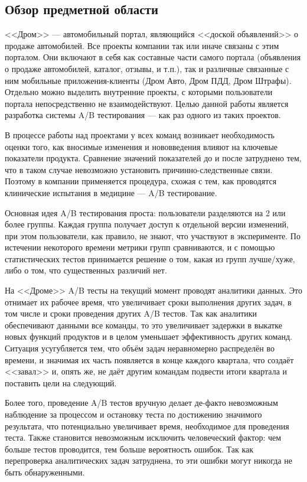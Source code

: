 \documentclass[../document.tex]{subfiles}
\begin{document}
	\subsection{Обзор предметной области}
	\par <<Дром>> --- автомобильный портал, являющийся <<доской объявлений>> о продаже автомобилей. Все проекты компании так или иначе связаны с этим порталом. Они включают в себя как составные части самого портала (объявления о продаже автомобилей, каталог, отзывы, и т.п.), так и различные связанные с ним мобильные приложения-клиенты (Дром Авто, Дром ПДД, Дром Штрафы). Отдельно можно выделить внутренние проекты, с которыми пользователи портала непосредственно не взаимодействуют. Целью данной работы является разработка системы A/B тестирования --- как раз одного из таких проектов.
	\par В процессе работы над проектами у всех команд возникает необходимость оценки того, как вносимые изменения и нововведения влияют на ключевые показатели продукта. Сравнение значений показателей до и после затруднено тем, что в таком случае невозможно установить причинно-следственные связи. Поэтому в компании применяется процедура, схожая с тем, как проводятся клинические испытания в медицине --- A/B тестирование.
	\par Основная идея A/B тестирования проста: пользователи разделяются на 2 или более группы. Каждая группа получает доступ к отдельной версии изменений, при этом пользователи, как правило, не знают, что участвуют в эксперименте. По истечении некоторого времени метрики групп сравниваются, и с помощью статистических тестов принимается решение о том, какая из групп лучше/хуже, либо о том, что существенных различий нет.
	\par На <<Дроме>> A/B тесты на текущий момент проводят аналитики данных. Это отнимает их рабочее время, что увеличивает сроки выполнения других задач, в том числе и сроки проведения других A/B тестов. Так как аналитики обеспечивают данными все команды, то это увеличивает задержки в выкатке новых функций продуктов и в целом уменьшает эффективность других команд. Ситуация усугубляется тем, что объём задач неравномерно распределён во времени, и значимая их часть появляется в конце каждого квартала, что создаёт <<завал>> и, опять же, не даёт другим командам подвести итоги квартала и поставить цели на следующий.
	\par Более того, проведение A/B тестов вручную делает де-факто невозможным наблюдение за процессом и остановку теста по достижению значимого результата, что потенциально увеличивает время, необходимое для проведения теста. Также становится невозможным исключить человеческий фактор: чем больше тестов проводится, тем больше вероятность ошибок. Так как перепроверка аналитических задач затруднена, то эти ошибки могут никогда не быть обнаруженными.
\end{document}
